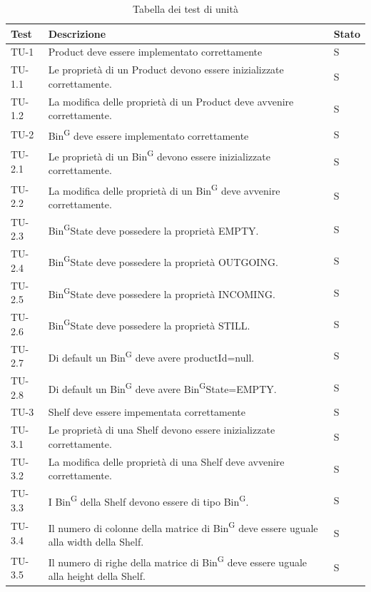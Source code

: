 \begin{xltabular}{0.9\textwidth}{X | p{0.6\textwidth} | p{0.1\textwidth} }
    \textbf{\color{white} Test} & \textbf{\color{white} Descrizione} & \textbf{\color{white} Stato}\\ 
    \hline
    \endhead
    \caption{Tabella dei test di unità} 
    \label{tab:test_sistema}
    \endlastfoot
    TU-1 & Product deve essere implementato correttamente & S\\
    TU-1.1 & Le proprietà di un Product devono essere inizializzate correttamente. & S\\
    TU-1.2 & La modifica delle proprietà di un Product deve avvenire correttamente. & S\\
    TU-2 & Bin\textsuperscript{G} deve essere implementato correttamente & S\\
    TU-2.1 & Le proprietà di un Bin\textsuperscript{G} devono essere inizializzate correttamente. & S\\
    TU-2.2 & La modifica delle proprietà di un Bin\textsuperscript{G} deve avvenire correttamente. & S\\
    TU-2.3 & Bin\textsuperscript{G}State deve possedere la proprietà EMPTY. & S\\
    TU-2.4 & Bin\textsuperscript{G}State deve possedere la proprietà OUTGOING. & S\\
    TU-2.5 & Bin\textsuperscript{G}State deve possedere la proprietà INCOMING. & S\\
    TU-2.6 & Bin\textsuperscript{G}State deve possedere la proprietà STILL. & S\\
    TU-2.7 & Di default un Bin\textsuperscript{G} deve avere productId=null. & S\\
    TU-2.8 & Di default un Bin\textsuperscript{G} deve avere Bin\textsuperscript{G}State=EMPTY. & S\\
    TU-3 & Shelf deve essere impementata correttamente & S\\
    TU-3.1 & Le proprietà di una Shelf devono essere inizializzate correttamente. & S\\
    TU-3.2 & La modifica delle proprietà di una Shelf deve avvenire correttamente. & S\\
    TU-3.3 & I Bin\textsuperscript{G} della Shelf devono essere di tipo Bin\textsuperscript{G}. & S\\
    TU-3.4 & Il numero di colonne della matrice di Bin\textsuperscript{G} deve essere uguale alla width della Shelf. & S\\
    TU-3.5 & Il numero di righe della matrice di Bin\textsuperscript{G} deve essere uguale alla height della Shelf. & S\\

\end{xltabular}
